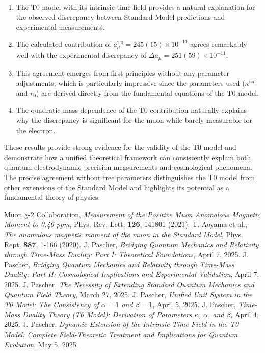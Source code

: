 \documentclass[12pt,a4paper]{article}
\begin{document}
	\begin{enumerate}
		\item The T0 model with its intrinsic time field provides a natural explanation for the observed discrepancy between Standard Model predictions and experimental measurements.
		
		\item The calculated contribution of $a_\mu^{\text{T0}} = 245(15) \times 10^{-11}$ agrees remarkably well with the experimental discrepancy of $\Delta a_\mu = 251(59) \times 10^{-11}$.
		
		\item This agreement emerges from first principles without any parameter adjustments, which is particularly impressive since the parameters used ($\kappa^{\text{nat}}$ and $r_0$) are derived directly from the fundamental equations of the T0 model.
		
		\item The quadratic mass dependence of the T0 contribution naturally explains why the discrepancy is significant for the muon while barely measurable for the electron.
	\end{enumerate}
	
	These results provide strong evidence for the validity of the T0 model and demonstrate how a unified theoretical framework can consistently explain both quantum electrodynamic precision measurements and cosmological phenomena. The precise agreement without free parameters distinguishes the T0 model from other extensions of the Standard Model and highlights its potential as a fundamental theory of physics.
	
	\begin{thebibliography}{99}
		 Muon g-2 Collaboration, \textit{Measurement of the Positive Muon Anomalous Magnetic Moment to 0.46 ppm}, Phys. Rev. Lett. \textbf{126}, 141801 (2021).
		 T. Aoyama et al., \textit{The anomalous magnetic moment of the muon in the Standard Model}, Phys. Rept. \textbf{887}, 1-166 (2020).
		 J. Pascher, \textit{Bridging Quantum Mechanics and Relativity through Time-Mass Duality: Part I: Theoretical Foundations}, April 7, 2025.
		 J. Pascher, \textit{Bridging Quantum Mechanics and Relativity through Time-Mass Duality: Part II: Cosmological Implications and Experimental Validation}, April 7, 2025.
		 J. Pascher, \textit{The Necessity of Extending Standard Quantum Mechanics and Quantum Field Theory}, March 27, 2025.
		 J. Pascher, \textit{Unified Unit System in the T0 Model: The Consistency of $\alpha = 1$ and $\beta = 1$}, April 5, 2025.
		 J. Pascher, \textit{Time-Mass Duality Theory (T0 Model): Derivation of Parameters $\kappa$, $\alpha$, and $\beta$}, April 4, 2025.
		 J. Pascher, \textit{Dynamic Extension of the Intrinsic Time Field in the T0 Model: Complete Field-Theoretic Treatment and Implications for Quantum Evolution}, May 5, 2025.
	\end{thebibliography}
	
\end{document}
